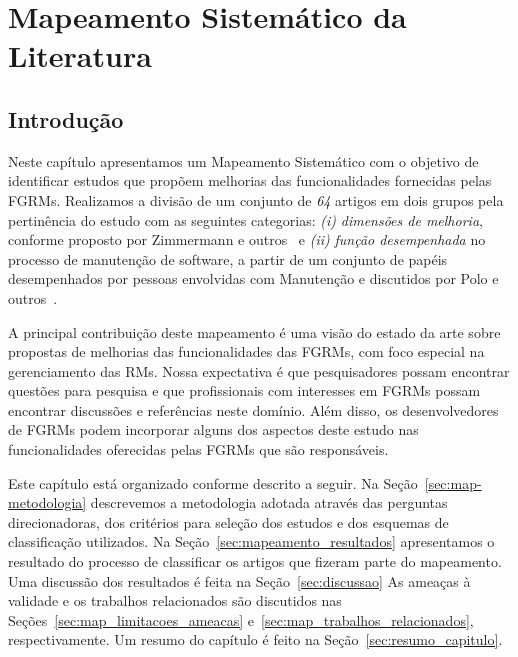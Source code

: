 
\chapter{Mapeamento Sistemático da Literatura}
\label{ch:mapeamento-sistematico}

\section{Introdução}
\label{sec:map-intro}

Neste capítulo apresentamos um Mapeamento Sistemático com o objetivo de
identificar estudos que propõem melhorias das funcionalidades fornecidas pelas
FGRMs. Realizamos a divisão de um conjunto de \textit{64} artigos em dois grupos
pela pertinência do estudo com as seguintes categorias: \textit{(i)}
\textit{dimensões de melhoria}, conforme proposto por Zimmermann e
outros~\cite{zimmermann2009improving} e \textit{(ii)} \textit{função
    desempenhada} no processo de manutenção de software, a partir de um conjunto
de papéis desempenhados por pessoas envolvidas com Manutenção e discutidos por
Polo e outros~\cite{Polo1999}.

A principal contribuição deste mapeamento é uma visão do estado da arte sobre
propostas de melhorias das funcionalidades das FGRMs, com foco especial na
gerenciamento das RMs. Nossa expectativa é que pesquisadores possam encontrar
questões para pesquisa e que profissionais com interesses em FGRMs possam
encontrar discussões e referências neste domínio. Além disso, os desenvolvedores
de FGRMs podem incorporar alguns dos aspectos deste estudo nas funcionalidades
oferecidas pelas FGRMs que são responsáveis.

Este capítulo está organizado conforme descrito a seguir. Na
Seção~\ref{sec:map-metodologia} descrevemos a metodologia adotada através das
perguntas direcionadoras, dos critérios para seleção dos estudos e dos esquemas
de classificação utilizados. Na Seção~\ref{sec:mapeamento_resultados}
apresentamos o resultado do processo de classificar os artigos que fizeram parte
do mapeamento. Uma discussão dos resultados é feita na Seção~\ref{sec:discussao}
As ameaças à validade e os trabalhos relacionados são discutidos nas
Seções~\ref{sec:map_limitacoes_ameacas} e~\ref{sec:map_trabalhos_relacionados},
respectivamente. Um resumo do capítulo é feito na
Seção~\ref{sec:resumo_capitulo}.

